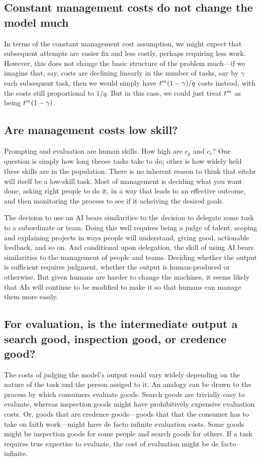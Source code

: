 \documentclass{article}
\theoremstyle{plain}
\theoremstyle{plain}
\begin{document}
\subsection{Constant management costs do not change the model much} \label{sec:constant_management_costs}
In terms of the constant management cost assumption, we might expect that subsequent attempts are easier fix and less costly, perhaps requiring less work. 
However, this does not change the basic structure of the problem much---if we imagine that, say, costs are declining linearly in the number of tasks, say by $\gamma$ each subsequent task, then we would simply have $t^{m}_{} (1-\gamma) / q$ costs instead, with the costs still proportional to $1/q$. 
But in this case, we could just treat $t^{m}_{}$ as being $t^{m}_{} (1-\gamma)$. 
  
\subsection{Are management costs low skill?}
Prompting and evaluation are human skills.
How high are $c_p$ and $c_e$?
One question is simply how long theose tasks take to do; other is how widely held these skills are in the population.
There is no inherent reason to think that eitehr will itself be a low-skill task.
Most of management is deciding what you want done, asking right people to do it, in a way that leads to an effective outcome, and then monitoring the process to see if it acheiving the desired goals.
  
The decision to use an AI bears similarities to the decision to delegate some task to a subordinate or team.
Doing this well requires being a judge of talent, scoping and explaining projects in ways people will understand, giving good, actionable feedback, and so on. 
And conditional upon delegation, the skill of using AI bears similarities to the management of people and teams. 
Deciding whether the output is sufficient requires judgment, whether the output is human-produced or otherwise. 
But given humans are harder to change the machines, it seems likely that AIs will continue to be modified to make it so that humans can manage them more easily. 
  
\subsection{For evaluation, is the intermediate output a search good, inspection good, or credence good?}
The costs of judging the model's output could vary widely depending on the nature of the task and the person assiged to it.
An analogy can be drawn to the process by which consumers evaluate goods. 
Search goods are trivially easy to evaluate, whereas inspection goods might have prohibitively expensive evaluation costs. 
Or, goods that are credence goods---goods that that the consumer has to take on faith work---might have de facto infinite evaluation costs.
Some goods might be inspection goods for some people and search goods for others. 
If a task requires true expertise to evaluate, the cost of evaluation might be de facto infinite.
  
\end{document}

